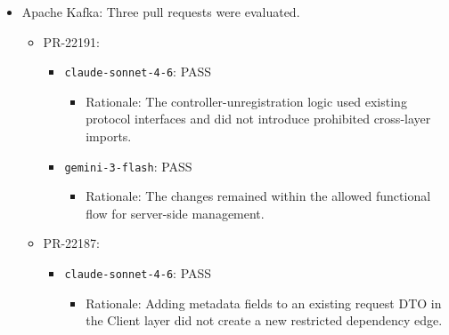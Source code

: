 \documentclass[sigconf,screen]{acmart}
\begin{document}
\begin{itemize}
\begin{itemize}
        \begin{itemize}
            \item \texttt{claude-sonnet-4-6}: PASS.
            \begin{itemize}
                \item Rationale: The export/import CLI changes did not add new disallowed CLI-to-server dependencies.
            \end{itemize}
            \item \texttt{gemini-3-flash}: PASS.
            \begin{itemize}
                \item Rationale: The branch did not introduce new violations against its tools/server rules.
            \end{itemize}
        \end{itemize}
    \end{itemize}
    \item Apache Kafka: Three pull requests were evaluated.
    \begin{itemize}
        \item PR-22191:
        \begin{itemize}
            \item \texttt{claude-sonnet-4-6}: PASS
            \begin{itemize}
                \item Rationale: The controller-unregistration logic used existing protocol interfaces and did not introduce prohibited cross-layer imports.
            \end{itemize}
            \item \texttt{gemini-3-flash}: PASS
            \begin{itemize}
                \item Rationale: The changes remained within the allowed functional flow for server-side management.
            \end{itemize}
        \end{itemize}
        \item PR-22187:
        \begin{itemize}
            \item \texttt{claude-sonnet-4-6}: PASS
            \begin{itemize}
                \item Rationale: Adding metadata fields to an existing request DTO in the Client layer did not create a new restricted dependency edge.
            \end{itemize}

\end{itemize}
\end{itemize}
\end{itemize}
\end{document}
